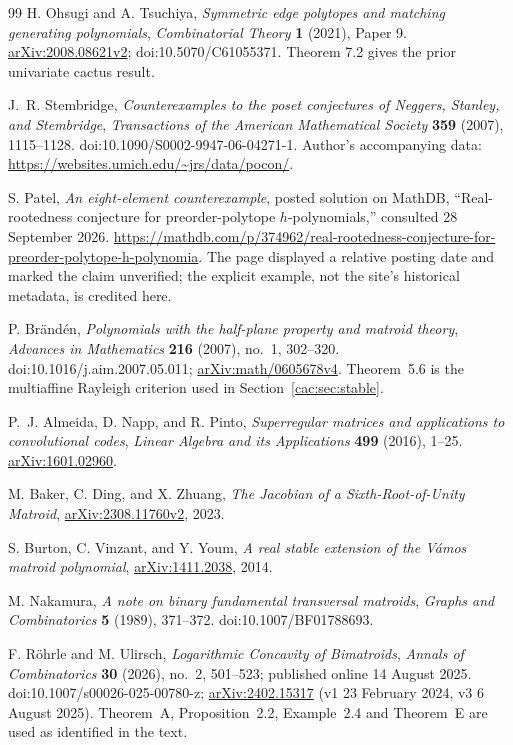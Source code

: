 \documentclass[11pt]{article}
\numberwithin{equation}{section}
\theoremstyle{definition}
\newcommand{\arxiv}[1]{\href{https://arxiv.org/abs/#1}{arXiv:#1}}
\begin{document}
\begin{thebibliography}{99}
H. Ohsugi and A. Tsuchiya,
\emph{Symmetric edge polytopes and matching generating polynomials},
\emph{Combinatorial Theory} \textbf{1} (2021), Paper 9.
\arxiv{2008.08621v2}; doi:10.5070/C61055371.
Theorem 7.2 gives the prior univariate cactus result.

J.~R. Stembridge,
\emph{Counterexamples to the poset conjectures of Neggers, Stanley,
and Stembridge},
\emph{Transactions of the American Mathematical Society}
\textbf{359} (2007), 1115--1128.
doi:10.1090/S0002-9947-06-04271-1.
Author's accompanying data:
\url{https://websites.umich.edu/~jrs/data/pocon/}.

\raggedright
S. Patel,
\emph{An eight-element counterexample}, posted solution on MathDB,
``Real-rootedness conjecture for preorder-polytope $h$-polynomials,''
consulted 28 September 2026.
\url{https://mathdb.com/p/374962/real-rootedness-conjecture-for-preorder-polytope-h-polynomia}.
The page displayed a relative posting date and marked the claim unverified;
the explicit example, not the site's historical metadata, is credited here.

P. Br\"and\'en,
\emph{Polynomials with the half-plane property and matroid theory},
\emph{Advances in Mathematics} \textbf{216} (2007), no.~1, 302--320.
doi:10.1016/j.aim.2007.05.011; \arxiv{math/0605678v4}.
Theorem~5.6 is the multiaffine Rayleigh criterion used in
Section~\ref{cac:sec:stable}.

P.~J. Almeida, D. Napp, and R. Pinto,
\emph{Superregular matrices and applications to convolutional codes},
\emph{Linear Algebra and its Applications} \textbf{499} (2016), 1--25.
\arxiv{1601.02960}.

M. Baker, C. Ding, and X. Zhuang,
\emph{The Jacobian of a Sixth-Root-of-Unity Matroid},
\arxiv{2308.11760v2}, 2023.

S. Burton, C. Vinzant, and Y. Youm,
\emph{A real stable extension of the V\'amos matroid polynomial},
\arxiv{1411.2038}, 2014.

M. Nakamura,
\emph{A note on binary fundamental transversal matroids},
\emph{Graphs and Combinatorics} \textbf{5} (1989), 371--372.
doi:10.1007/BF01788693.

F. R\"ohrle and M. Ulirsch,
\emph{Logarithmic Concavity of Bimatroids},
\emph{Annals of Combinatorics} \textbf{30} (2026), no.~2, 501--523;
published online 14 August 2025. doi:10.1007/s00026-025-00780-z;
\arxiv{2402.15317} (v1 23 February 2024, v3 6 August 2025).
Theorem~A, Proposition~2.2, Example~2.4 and Theorem~E are used as
identified in the text.


\end{thebibliography}
\end{document}
